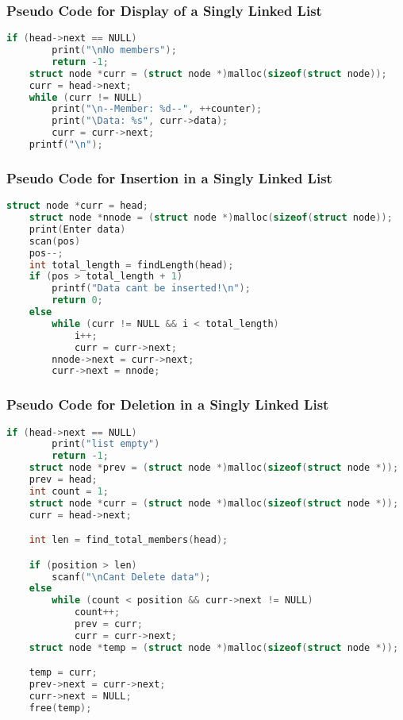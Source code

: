 \documentclass[11pt]{article}
\begin{document}
\subsubsection{Pseudo Code for Display of a Singly Linked List}
\begin{lstlisting}[language=C]
    if (head->next == NULL)
        print("\nNo members");
        return -1;
    struct node *curr = (struct node *)malloc(sizeof(struct node));
    curr = head->next;
    while (curr != NULL)
        print("\n--Member: %d--", ++counter);
        print("\Data: %s", curr->data);
        curr = curr->next;
    printf("\n");
\end{lstlisting}
\subsubsection{Pseudo Code for Insertion in a Singly Linked List}
\begin{lstlisting}[language=C]
	struct node *curr = head;
    struct node *nnode = (struct node *)malloc(sizeof(struct node));
    print(Enter data)
	scan(pos)
    pos--;
    int total_length = findLength(head);
    if (pos > total_length + 1)
        printf("Data cant be inserted!\n");
        return 0;
    else
        while (curr != NULL && i < total_length)
            i++;
            curr = curr->next;
        nnode->next = curr->next;
        curr->next = nnode;
\end{lstlisting}
\subsubsection{Pseudo Code for Deletion in a Singly Linked List}
\begin{lstlisting}[language=C]
	if (head->next == NULL)
		print("list empty")
		return -1;
    struct node *prev = (struct node *)malloc(sizeof(struct node *));
    prev = head;
    int count = 1;
    struct node *curr = (struct node *)malloc(sizeof(struct node *));
    curr = head->next;

    int len = find_total_members(head);

    if (position > len)
        scanf("\nCant Delete data");
    else
        while (count < position && curr->next != NULL)
            count++;
            prev = curr;
            curr = curr->next;
    struct node *temp = (struct node *)malloc(sizeof(struct node *));

    temp = curr;
    prev->next = curr->next;
    curr->next = NULL;
    free(temp);
\end{lstlisting}
\end{document}

